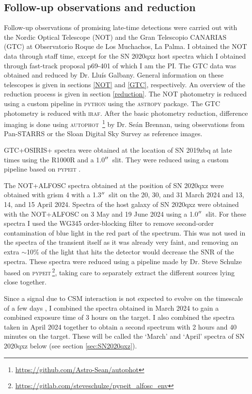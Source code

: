 \documentclass[a4paper,oneside,12pt, class=Latex/Classes/PhDthesisPSnPDF, crop=false]{standalone}
\begin{document}
\subsection{Follow-up observations and reduction}
\label{sec:reduction}
Follow-up observations of promising late-time detections were carried out with the Nordic Optical Telescope (NOT) and the Gran Telescopio CANARIAS (GTC) at Observatorio Roque de Los Muchachos, La Palma. I obtained the NOT data through staff time, except for the SN 2020qxz host spectra which I obtained through fast-track proposal p69-401 of which I am the PI. The GTC data was obtained and reduced by Dr. Lluís Galbany. General information on these telescopes is given in sections \ref{NOT} and \ref{GTC}, respectively. An overview of the reduction process is given in section \ref{reduction}. The NOT photometry is reduced using a custom pipeline in \textsc{python} using the \textsc{astropy} package. The GTC photometry is reduced with \textsc{iraf}. After the basic photometry reduction, difference imaging is done using \textsc{autophot} \citep{Autophot}\,\footnote{\url{https://github.com/Astro-Sean/autophot}} by Dr. Seán Brennan, using observations from Pan-STARRS \citep{Pan-STARRS1} or the Sloan Digital Sky Survey \citep[SDSS, ][]{SDSS-I-II, SDSS_DR4, SDSS_telescope} as reference images.

GTC+OSIRIS+ spectra were obtained at the location of SN 2019zbq at late times using the R1000R and a 1.0$^{\prime\prime}$\ slit. They were reduced using a custom pipeline based on \textsc{pypeit} \citep{pypeit:joss_pub, pypeit:zenodo}.

The NOT+ALFOSC spectra obtained at the position of SN 2020qxz were obtained with grism 4 with a 1.3$^{\prime\prime}$\ slit on the 20, 30, and 31 March 2024 and 13, 14, and 15 April 2024. Spectra of the host galaxy of SN 2020qxz were obtained with the NOT+ALFOSC on 3 May and 19 June 2024 using a 1.0$^{\prime\prime}$\ slit. For these spectra I used the WG345 order-blocking filter to remove second-order contamination of blue light in the red part of the spectrum. This was not used in the spectra of the transient itself as it was already very faint, and removing an extra $\sim$10\% of the light that hits the detector would decrease the SNR of the spectra. These spectra were reduced using a pipeline made by Dr. Steve Schulze based on \textsc{pypeit}\,\footnote{\url{https://gitlab.com/steveschulze/pypeit_alfosc_env}}, taking care to separately extract the different sources lying close together.

Since a signal due to CSM interaction is not expected to evolve on the timescale of a few days \citep[e.g.,][]{2015cp}, I combined the spectra obtained in March 2024 to gain a combined exposure time of 3 hours on the target. I also combined the spectra taken in April 2024 together to obtain a second spectrum with 2 hours and 40 minutes on the target. These will be called the `March' and `April' spectra of SN 2020qxz below (see section \ref{sec:SN2020qxz}).
\end{document}
